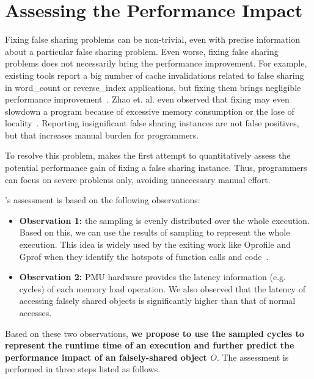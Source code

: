 \section{Assessing the Performance Impact}

\label{sec:predictimprove}

Fixing false sharing problems can be non-trivial, even with precise information about a particular false sharing problem. Even worse, fixing false sharing problems does not necessarily bring the performance improvement. For example, existing tools report a big number of cache invalidations related to false sharing in word\_count or reverse\_index applications, but fixing them brings negligible performance improvement~\cite{Sheriff, Predator}. Zhao et. al. even observed that fixing may even slowdown a program because of excessive memory consumption or the lose of locality~\cite{qinzhao}. Reporting insignificant false sharing instances are not false positives, but that increases manual burden for programmers.

To resolve this problem, \cheetah{} makes the first attempt to quantitatively assess the potential performance gain of fixing a false sharing instance. Thus, programmers can focus on severe problems only, avoiding unnecessary manual effort.

\cheetah{}'s assessment is based on the following observations:

\begin{itemize}
\item {\bf Observation 1:} the sampling is evenly distributed over the whole execution. Based on this, we can  use the results of sampling to represent the whole execution. This idea is widely used by the exiting work like Oprofile and Gprof when they identify the hotspots of function calls and code~\cite{oprofile, DBLP:conf/sigplan/GrahamKM82}.

\item {\bf Observation 2:} PMU hardware provides the latency information (e.g. cycles) of each memory load operation. We also observed that the latency of accessing falsely shared objects is significantly higher than that of normal accesses. 

\end{itemize}

Based on these two observations, {\bf we propose to use the sampled cycles to represent the runtime time of an execution and further predict the performance impact of an falsely-shared object $O$}. The assessment is performed in three steps listed as follows. 

